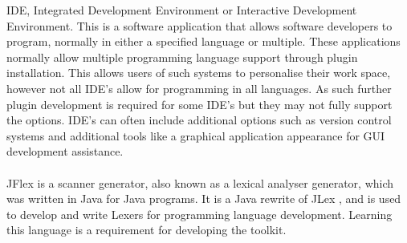 IDE, Integrated Development Environment or Interactive Development Environment. This is a software application that allows software developers to program, normally in either a specified language or multiple. These applications normally allow multiple programming language support through plugin installation. This allows users of such systems to personalise their work space, however not all IDE's allow for programming in all languages. As such further plugin development is required for some IDE's but they may not fully support the options. IDE's can often include additional options such as version control systems and additional tools like a graphical application appearance for GUI development assistance.\\
\\
JFlex is a scanner generator, also known as a lexical analyser generator, which was written in Java for Java programs. It is a Java rewrite of JLex , and is used to develop and write Lexers for programming language development. Learning this language is a requirement for developing the toolkit. \\
\\
